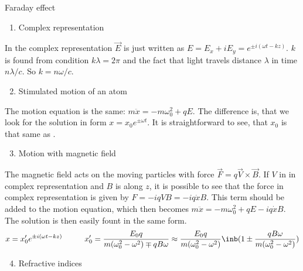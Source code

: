 \begin{enumerate}
{\bfseries
\item Faraday effect
}

\begin{enumerate}
    \item Complex representation
\end{enumerate}

\hspace{.5cm}
In the complex representation $\vec{E}$ is just written as
$E = E_x + i E_y = e^{\pm i (\omega t - kz)}$.
$k$ is found from condition $k \lambda = 2 \pi$ and the fact
that light travels distance $\lambda$ in time $n\lambda / c$.
So $k = n\omega / c$.

\begin{enumerate}
    \setcounter{enumii}{1}
    \item Stimulated motion of an atom
\end{enumerate}

\hspace{.5cm}
The motion equation is the same: $m \ddot{x} = -m \omega_0^2 + qE$.
The difference is, that we look for the solution in form $x = x_0 e^{\pm \omega t}$.
It is straightforward to see, that $x_0$ is that same as .

\begin{enumerate}
    \setcounter{enumii}{2}
    \item Motion with magnetic field
\end{enumerate}

\hspace{.5cm}
The magnetic field acts on the moving particles with force
$\vec{F} = q \vec{V} \times \vec{B}$.
If $V$ in in complex representation and $B$ is along $z$,
it is possible to see that
the force in complex representation
is given by $F = -iqVB = -iq \dot{x} B$.
This term should be added to the motion equation,
which then becomes $m \ddot{x} = -m \omega_0^2 + qE - iq\dot{x}B$.
The solution is then easily fount in the same form.
\begin{equation}
    x = x'_0 e^{\pm i (\omega t - kz)} \hspace{1cm}
    x'_0 = \frac{E_0 q}{m (\omega_0^2 - \omega^2) \mp q B\omega} \approx
    \frac{E_0 q}{m (\omega_0^2 - \omega^2)}
    \inb({1 \pm \frac{qB\omega}{m (\omega_0^2 - \omega^2)} })
\end{equation}

\begin{enumerate}
    \setcounter{enumii}{3}
    \item Refractive indices
\end{enumerate}


\end{enumerate}
